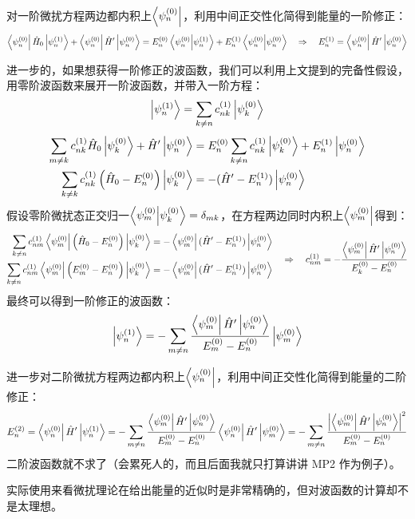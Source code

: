 对一阶微扰方程两边都内积上$\bra{\psi_n^{(0)}}$，利用中间正交性化简得到能量的一阶修正：
\[\bra{\psi_n^{(0)}}\hat{H}_0\ket{\psi_n^{(1)}}+\bra{\psi_n^{(0)}}\hat{H}'\ket{\psi_n^{(0)}}=E_n^{(0)}\bra{\psi_n^{(0)}}\ket{\psi_n^{(1)}}+E_n^{(1)}\bra{\psi_n^{(0)}}\ket{\psi_n^{(0)}} \quad \Rightarrow \quad E_n^{(1)}=\bra{\psi_n^{(0)}}\hat{H}'\ket{\psi_n^{(0)}}\]

进一步的，如果想获得一阶修正的波函数，我们可以利用上文提到的完备性假设，用零阶波函数来展开一阶波函数，并带入一阶方程：
\[\ket{\psi_n^{(1)}}=\sum_{k\neq n}c_{nk}^{(1)}\ket{\psi_k^{(0)}}\]
\[\begin{aligned}
\sum_{m\neq k}c_{nk}^{(1)}\hat{H}_0\ket{\psi_k^{(0)}}+\hat{H}'\ket{\psi_n^{(0)}}&=E_n^{(0)}\sum_{k\neq n}c_{nk}^{(1)}\ket{\psi_k^{(0)}}+E_n^{(1)}\ket{\psi_n^{(0)}} \\ 
\sum_{k\neq k}c_{nk}^{(1)}\left(\hat{H}_0-E_n^{(0)}\right)\ket{\psi_k^{(0)}}&=-(\hat{H}'-E_n^{(1)})\ket{\psi_n^{(0)}}
\end{aligned}\]
假设零阶微扰态正交归一$\bra{\psi_m^{(0)}}\ket{\psi_k^{(0)}}=\delta_{mk}$，在方程两边同时内积上$\bra{\psi_m^{(0)}}$得到：
\[\begin{aligned}
\sum_{k\neq n}c_{nm}^{(1)}\bra{\psi_m^{(0)}}\left(\hat{H}_0-E_n^{(0)}\right)\ket{\psi_k^{(0)}}&=-\bra{\psi_m^{(0)}}(\hat{H}'-E_n^{(1)})\ket{\psi_n^{(0)}}\\
\sum_{k\neq n}c_{nm}^{(1)}\bra{\psi_m^{(0)}}\left(E_m^{(0)}-E_n^{(0)}\right)\ket{\psi_k^{(0)}}&=-\bra{\psi_m^{(0)}}(\hat{H}'-E_n^{(1)})\ket{\psi_n^{(0)}}
\end{aligned} \quad \Rightarrow \quad c_{nm}^{(1)}=-\frac{\bra{\psi_m^{(0)}}\hat{H}'\ket{\psi_n^{(0)}}}{E_k^{(0)}-E_n^{(0)}}\]
最终可以得到一阶修正的波函数：
\[\ket{\psi_n^{(1)}}=-\sum_{m\neq n}\frac{\bra{\psi_m^{(0)}}\hat{H}'\ket{\psi_n^{(0)}}}{E_m^{(0)}-E_n^{(0)}}\ket{\psi_m^{(0)}}\]

进一步对二阶微扰方程两边都内积上$\bra{\psi_n^{(0)}}$，利用中间正交性化简得到能量的二阶修正：
\[E_n^{(2)}=\bra{\psi_n^{(0)}}\hat{H}'\ket{\psi_n^{(1)}}=-\sum_{m\neq n}\frac{\bra{\psi_m^{(0)}}\hat{H}'\ket{\psi_n^{(0)}}}{E_m^{(0)}-E_n^{(0)}}\bra{\psi_n^{(0)}}\hat{H}'\ket{\psi_m^{(0)}}=-\sum_{m\neq n}\frac{\left|\bra{\psi_m^{(0)}}\hat{H}'\ket{\psi_n^{(0)}}\right|^2}{E_m^{(0)}-E_n^{(0)}}\]
二阶波函数就不求了（会累死人的，而且后面我就只打算讲讲 MP2 作为例子）。

实际使用来看微扰理论在给出能量的近似时是非常精确的，但对波函数的计算却不是太理想。

